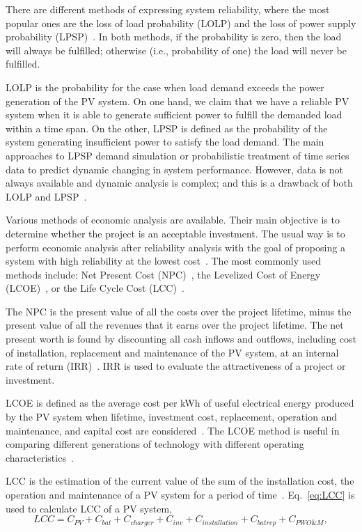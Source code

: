 There are different methods of expressing system reliability, where the most popular ones 
are the loss of load probability (LOLP) and the loss of power supply probability (LPSP)~\cite{Alsadi2018}. In both methods, if the probability is zero, then the load will always be fulfilled; otherwise (i.e., probability of one) the load will never be fulfilled.

LOLP is the probability for the case when load demand exceeds the power generation of the PV system. On one hand, we claim that we have a reliable PV system when it is able to generate sufficient power to fulfill the demanded load within a time span. On the other, LPSP is defined as the probability of the system generating insufficient power to satisfy the load demand. The main approaches to LPSP demand simulation or probabilistic treatment of time series data to predict dynamic changing in system performance. However, data is not always available and dynamic analysis is complex; and this is a drawback of both LOLP and LPSP~\cite{Alsadi2018}.

Various methods of economic analysis are available. Their main objective is to determine whether the project is an acceptable investment. The usual way is to perform economic analysis after reliability analysis with the goal of proposing a system with high reliability at the lowest cost~\cite{Alsadi2018}. The most commonly used methods include: Net Present Cost (NPC)~\cite{Park2004}, the Levelized Cost of Energy (LCOE)~\cite{Zhou2010}, or the Life Cycle Cost (LCC)~\cite{Applasamy2011}.

The NPC is the present value of all the costs over the project lifetime, minus the present value of all the revenues that it earns over the project lifetime. The net present worth is found by discounting all cash inflows and outflows, including cost of installation, replacement and maintenance of the PV system, at an internal rate of return (IRR)~\cite{Park2004}. IRR is used to evaluate the attractiveness of a project or investment.

LCOE is defined as the average cost per kWh of useful electrical energy produced by the PV system when lifetime, investment cost, replacement, operation and maintenance, and capital cost are considered~\cite{Kamel2005}. The LCOE method is useful in comparing different generations of technology with different operating characteristics~\cite{Zhou2010}.

LCC is the estimation of the current value of the sum of the installation cost, the operation and maintenance of a PV system for a period of time~\cite{Applasamy2011}. Eq.~\eqref{eq:LCC} is used to calculate LCC of a PV system,
%
\begin{equation}
\label{eq:LCC}
LCC = C_{PV} + C_{bat} + C_{charger} + C_{inv} + C_{installation} + C_{batrep} + C_{PWO\&M},
\end{equation}

